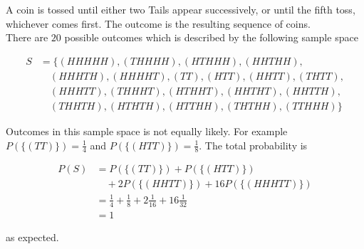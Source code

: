 \begin{texample}
	A coin is tossed until either two Tails appear successively, or until the fifth toss, whichever comes first. The outcome is the resulting sequence of coins. \\
	
	There are $20$ possible outcomes which is described by the following sample space
	
	\begin{align*}
		S&=\{(HHHHH), (THHHH), (HTHHH), (HHTHH), \\
		&\quad (HHHTH), (HHHHT), (TT), (HTT), (HHTT), (THTT), \\
		&\quad (HHHTT), (THHHT), (HTHHT), (HHTHT), (HHTTH), \\
		&\quad (THHTH), (HTHTH), (HTTHH), (THTHH), (TTHHH)\}
	\end{align*}
	
	Outcomes in this sample space is not equally likely. For example $P(\{(TT)\})=\frac{1}{4}$ and $P(\{(HTT)\})=\frac{1}{8}$. The total probability is
	
	\begin{align*}
		P(S)&=P(\{(TT)\})+P(\{(HTT)\}) \\
		&\quad+2 P(\{(HHTT)\})+16  P(\{(HHHTT)\}) \\
		&=\frac{1}{4}+\frac{1}{8}+2\frac{1}{16}+16\frac{1}{32} \\
		&=1
	\end{align*}
	
	as expected.
\end{texample}

